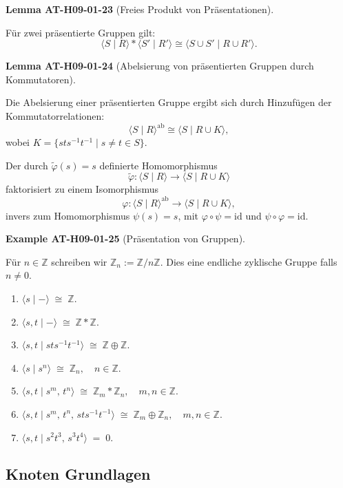 \documentclass[10pt, letterpaper]{article}
\newcommand{\CustomHeading}[3]{%
  \par\medskip\noindent%
  \textbf{#1 #2} \textnormal{(#3)}.\enskip%
}
\newenvironment{LEM}[2]{\CustomHeading{Lemma}{#1}{#2}}{}
\newenvironment{EXA}[2]{\CustomHeading{Example}{#1}{#2}}{}
\begin{document}
\begin{LEM}{AT-H09-01-23}{Freies Produkt von Präsentationen}
Für zwei präsentierte Gruppen gilt:
\[
\langle S \mid R\rangle * \langle S' \mid R'\rangle \cong \langle S \cup S' \mid R \cup R'\rangle.
\]
\end{LEM}

\begin{LEM}{AT-H09-01-24}{Abelsierung von präsentierten Gruppen durch Kommutatoren}
Die Abelsierung einer präsentierten Gruppe ergibt sich durch Hinzufügen der Kommutatorrelationen:
\[
\langle S \mid R\rangle^{\mathrm{ab}} \cong \langle S \mid R \cup K\rangle,
\]
wobei $K = \{ sts^{-1}t^{-1} \mid s \neq t \in S \}$.

Der durch $\tilde{\varphi}(s) = s$ definierte Homomorphismus
\[
\tilde{\varphi}: \langle S \mid R\rangle \to \langle S \mid R \cup K\rangle
\]
faktorisiert zu einem Isomorphismus
\[
\varphi: \langle S \mid R\rangle^{\mathrm{ab}} \to \langle S \mid R \cup K\rangle,
\]
invers zum Homomorphismus $\psi(s) = s$, mit $\varphi \circ \psi = \mathrm{id}$ und $\psi \circ \varphi = \mathrm{id}$.
\end{LEM}

\begin{EXA}{AT-H09-01-25}{Präsentation von Gruppen}
Für $n \in \mathbb{Z}$ schreiben wir $\mathbb{Z}_n:=\mathbb{Z} / n \mathbb{Z}$. Dies eine endliche zyklische Gruppe falls $n \neq 0$.
\begin{enumerate}[label=(\roman*)]
  \item $\langle s \mid - \rangle \;\cong\; \mathbb{Z}.$
  \item $\langle s, t \mid - \rangle \;\cong\; \mathbb{Z} * \mathbb{Z}.$
  \item $\langle s, t \mid s t s^{-1} t^{-1} \rangle \;\cong\; \mathbb{Z} \oplus \mathbb{Z}.$
  \item $\langle s \mid s^{n} \rangle \;\cong\; \mathbb{Z}_{n}, \quad n \in \mathbb{Z}.$
  \item $\langle s, t \mid s^{m},\, t^{n} \rangle \;\cong\; \mathbb{Z}_{m} * \mathbb{Z}_{n}, \quad m,n \in \mathbb{Z}.$
  \item $\langle s, t \mid s^{m},\, t^{n},\, s t s^{-1} t^{-1} \rangle 
        \;\cong\; \mathbb{Z}_{m} \oplus \mathbb{Z}_{n}, \quad m,n \in \mathbb{Z}.$
  \item $\langle s, t \mid s^{2} t^{3},\, s^{3} t^{4} \rangle \;=\; 0.$
\end{enumerate}
\end{EXA}

\subsection{Knoten Grundlagen}
\end{document}
